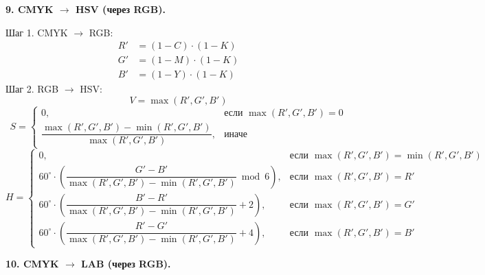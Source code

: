 \documentclass[12pt,a4paper]{article}
\begin{document}
\textbf{9. CMYK \(\to\) HSV (через RGB).}

Шаг 1. CMYK \(\to\) RGB:
\begin{align*}
R' &= (1 - C) \cdot (1 - K) \\
G' &= (1 - M) \cdot (1 - K) \\
B' &= (1 - Y) \cdot (1 - K)
\end{align*}
Шаг 2. RGB \(\to\) HSV:
\[
V = \max(R', G', B')
\]
\[
S = \begin{cases}
0, & \text{если } \max(R', G', B') = 0 \\[8pt]
\dfrac{\max(R', G', B') - \min(R', G', B')}{\max(R', G', B')}, & \text{иначе}
\end{cases}
\]
\[
H = \begin{cases}
0, & \text{если } \max(R', G', B') = \min(R', G', B') \\[8pt]
60^\circ \cdot \left( \dfrac{G' - B'}{\max(R', G', B') - \min(R', G', B')} \bmod 6 \right), & \text{если } \max(R', G', B') = R' \\[12pt]
60^\circ \cdot \left( \dfrac{B' - R'}{\max(R', G', B') - \min(R', G', B')} + 2 \right), & \text{если } \max(R', G', B') = G' \\[12pt]
60^\circ \cdot \left( \dfrac{R' - G'}{\max(R', G', B') - \min(R', G', B')} + 4 \right), & \text{если } \max(R', G', B') = B'
\end{cases}
\]

\textbf{10. CMYK \(\to\) LAB (через RGB).}
\end{document}
